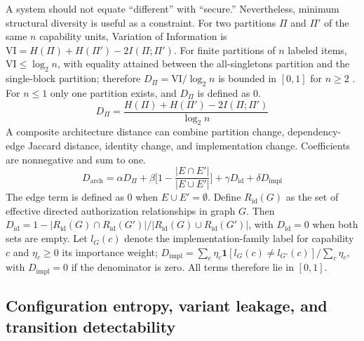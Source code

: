 \documentclass[11pt,letterpaper]{article}
\begin{document}
A system should not equate ``different'' with ``secure.'' Nevertheless, minimum structural diversity is useful as a constraint. For two partitions $\Pi$ and $\Pi'$ of the same $n$ capability units, Variation of Information is $\mathrm{VI}=H(\Pi)+H(\Pi')-2I(\Pi;\Pi')$. For finite partitions of $n$ labeled items, $\mathrm{VI}\le\log_2 n$, with equality attained between the all-singletons partition and the single-block partition; therefore $D_\Pi=\mathrm{VI}/\log_2 n$ is bounded in $[0,1]$ for $n\ge2$ \cite{meila2007}. For $n\le1$ only one partition exists, and $D_\Pi$ is defined as 0.
\begin{equation}
D_\Pi=\frac{H(\Pi)+H(\Pi')-2I(\Pi;\Pi')}{\log_2 n}
\end{equation}
A composite architecture distance can combine partition change, dependency-edge Jaccard distance, identity change, and implementation change. Coefficients are nonnegative and sum to one.
\begin{equation}\label{eq:darch}
D_{\mathrm{arch}}=\alpha D_\Pi+\beta\Big[1-\frac{|E\cap E'|}{|E\cup E'|}\Big]+\gamma D_{\mathrm{id}}+\delta D_{\mathrm{impl}}
\end{equation}
The edge term is defined as 0 when $E\cup E'=\emptyset$. Define $R_{\mathrm{id}}(G)$ as the set of effective directed authorization relationships in graph $G$. Then $D_{\mathrm{id}}=1-|R_{\mathrm{id}}(G)\cap R_{\mathrm{id}}(G')|/|R_{\mathrm{id}}(G)\cup R_{\mathrm{id}}(G')|$, with $D_{\mathrm{id}}=0$ when both sets are empty. Let $l_G(c)$ denote the implementation-family label for capability $c$ and $\eta_c\ge0$ its importance weight; $D_{\mathrm{impl}}=\sum_c\eta_c\mathbf{1}[l_G(c)\ne l_{G'}(c)]/\sum_c\eta_c$, with $D_{\mathrm{impl}}=0$ if the denominator is zero. All terms therefore lie in $[0,1]$.

\subsection{Configuration entropy, variant leakage, and transition detectability}
\end{document}
